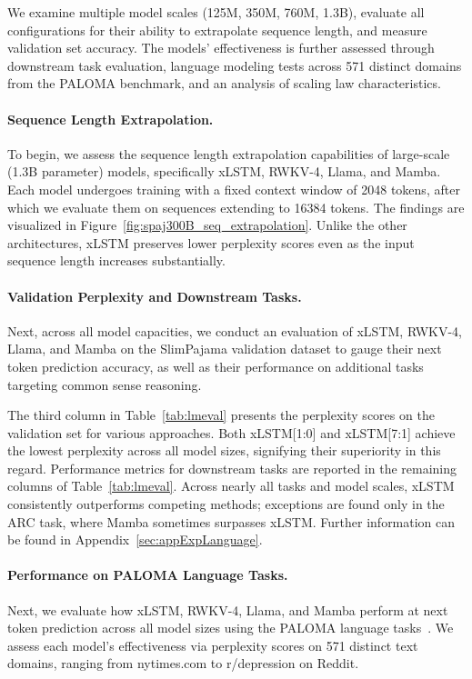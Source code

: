 We examine multiple model scales (125M, 350M, 760M, 1.3B), evaluate all configurations for their ability to extrapolate sequence length, and measure validation set accuracy. The models' effectiveness is further assessed through downstream task evaluation, language modeling tests across 571 distinct domains from the PALOMA benchmark, and an analysis of scaling law characteristics.

\paragraph{Sequence Length Extrapolation.}
\label{sec:spaj300B_ctx_extrapolation}
To begin, we assess the sequence length extrapolation capabilities of large-scale (1.3B parameter) models, specifically xLSTM, RWKV-4, Llama, and Mamba. Each model undergoes training with a fixed context window of 2048 tokens, after which we evaluate them on sequences extending to 16384 tokens. The findings are visualized in Figure~\ref{fig:spaj300B_seq_extrapolation}. Unlike the other architectures, xLSTM preserves lower perplexity scores even as the input sequence length increases substantially.

\paragraph{Validation Perplexity and Downstream Tasks.}
\label{sec:spaj_downstream_eval}
Next, across all model capacities, we conduct an evaluation of xLSTM, RWKV-4, Llama, and Mamba on the SlimPajama validation dataset to gauge their next token prediction accuracy, as well as their performance on additional tasks targeting common sense reasoning.

The third column in 
Table~\ref{tab:lmeval} presents the perplexity scores on the validation set for various approaches. Both xLSTM[1:0] and xLSTM[7:1] achieve the lowest perplexity across all model sizes, signifying their superiority in this regard. Performance metrics for downstream tasks are reported in the remaining columns of 
Table~\ref{tab:lmeval}. Across nearly all tasks and model scales, xLSTM consistently outperforms competing methods; exceptions are found only in the ARC task, where Mamba sometimes surpasses xLSTM. Further information can be found in Appendix~\ref{sec:appExpLanguage}.

\paragraph{Performance on PALOMA Language Tasks.} Next, we evaluate how xLSTM, RWKV-4, Llama, and Mamba perform at next token prediction across all model sizes using the PALOMA language tasks~\citep{Magnusson:23arxivshort}. We assess each model's effectiveness via perplexity scores on 571 distinct text domains, ranging from nytimes.com to r/depression on Reddit. 

